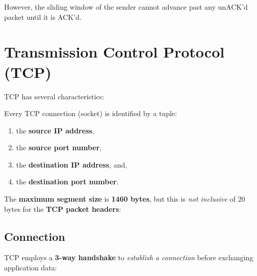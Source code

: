 However, the sliding window of the sender cannot advance past any unACK'd packet until
it is ACK'd.


\section{Transmission Control Protocol (TCP)}
TCP has several characteristics:

\begin{itemize*}
\end{itemize*}

Every TCP connection (socket) is identified by a tuple:
\begin{enumerate}
    \item the \textbf{source IP address},
    \item the \textbf{source port number},
    \item the \textbf{destination IP address}, and,
    \item the \textbf{destination port number}.
\end{enumerate}

The \textbf{maximum segment size} is \textbf{1460 bytes}, but this is \textit{not inclusive} of 20 bytes
for the \textbf{TCP packet headers}:

\begin{enumerate*}
\end{enumerate*}

\subsection{Connection}
TCP employs a \textbf{3-way handshake} to \textit{establish a connection} before exchanging application data:

